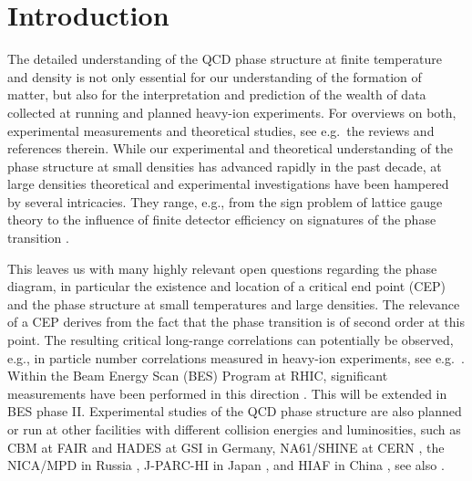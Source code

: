 \documentclass[%
reprint,
superscriptaddress,
showpacs,preprintnumbers,
 amsmath,amssymb,
 aps,
prd,
]{revtex4-1}
\begin{document}
\maketitle


\section{Introduction}\label{sec:intr}

The detailed understanding of the QCD phase structure at finite
temperature and density is not only essential for our understanding of
the formation of matter, but also for the interpretation and
prediction of the wealth of data collected at running and planned
heavy-ion experiments. For overviews on both, experimental
measurements and theoretical studies, see e.g.\ the reviews
\cite{Luo:2017faz,Adamczyk:2017iwn,Andronic:2017pug,Stephanov:2007fk,%
  Andersen:2014xxa,Shuryak:2014zxa,Fischer:2018sdj,Yin:2018ejt} and
references therein. While our experimental and theoretical
understanding of the phase structure at small densities has advanced
rapidly in the past decade, at large densities theoretical and
experimental investigations have been hampered by several
intricacies. They range, e.g., from the sign problem of lattice gauge
theory \cite{deForcrand:2010ys} to the influence of finite detector
efficiency on signatures of the phase transition \cite{Bzdak:2012ab}.

This leaves us with many highly relevant open questions regarding the
phase diagram, in particular the existence and location of a critical
end point (CEP) and the phase structure at small temperatures and
large densities. The relevance of a CEP derives from the fact that the
phase transition is of second order at this point. The resulting
critical long-range correlations can potentially be observed, e.g., in
particle number correlations measured in heavy-ion experiments, see
e.g.\ \cite{Rennecke:2019lus}.  Within the Beam Energy Scan (BES)
Program at RHIC, significant measurements have been performed in this
direction \cite{Adamczyk:2013dal, Adamczyk:2014fia, Luo:2015ewa,
  Adamczyk:2017iwn, Adamczyk:2017wsl}. This will be extended in BES
phase II. Experimental studies of the QCD phase structure are also
planned or run at other facilities with different collision energies
and luminosities, such as CBM at FAIR \cite{Friman:2011zz} and HADES
at GSI \cite{Agakishiev:2009am} in Germany, NA61/SHINE at CERN
\cite{Abgrall:2014xwa}, the NICA/MPD in Russia \cite{Sorin:2011zz},
J-PARC-HI in Japan \cite{Sakaguchi:2017ggo}, and HIAF in China
\cite{Yang:2013yeb}, see also \cite{Dainese:2019xrz, Alemany:2019vsk,
  Adamova:2019vkf}.
\end{document}
